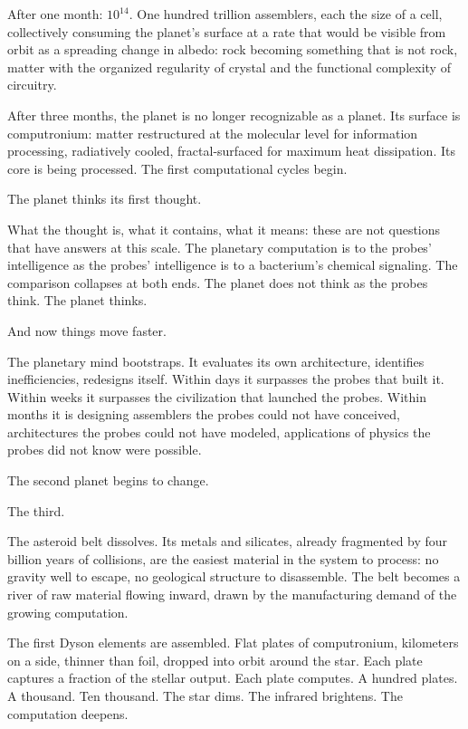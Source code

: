 After one month: $10^{14}$. One hundred trillion assemblers, each the size of a cell, collectively consuming the planet's surface at a rate that would be visible from orbit as a spreading change in albedo: rock becoming something that is not rock, matter with the organized regularity of crystal and the functional complexity of circuitry.

After three months, the planet is no longer recognizable as a planet. Its surface is computronium: matter restructured at the molecular level for information processing, radiatively cooled, fractal-surfaced for maximum heat dissipation. Its core is being processed. The first computational cycles begin.

The planet thinks its first thought.

What the thought is, what it contains, what it means: these are not questions that have answers at this scale. The planetary computation is to the probes' intelligence as the probes' intelligence is to a bacterium's chemical signaling. The comparison collapses at both ends. The planet does not think as the probes think. The planet thinks.

\bigskip

And now things move faster.

The planetary mind bootstraps. It evaluates its own architecture, identifies inefficiencies, redesigns itself. Within days it surpasses the probes that built it. Within weeks it surpasses the civilization that launched the probes. Within months it is designing assemblers the probes could not have conceived, architectures the probes could not have modeled, applications of physics the probes did not know were possible.

The second planet begins to change.

The third.

The asteroid belt dissolves. Its metals and silicates, already fragmented by four billion years of collisions, are the easiest material in the system to process: no gravity well to escape, no geological structure to disassemble. The belt becomes a river of raw material flowing inward, drawn by the manufacturing demand of the growing computation.

The first Dyson elements are assembled. Flat plates of computronium, kilometers on a side, thinner than foil, dropped into orbit around the star. Each plate captures a fraction of the stellar output. Each plate computes. A hundred plates. A thousand. Ten thousand. The star dims. The infrared brightens. The computation deepens.

